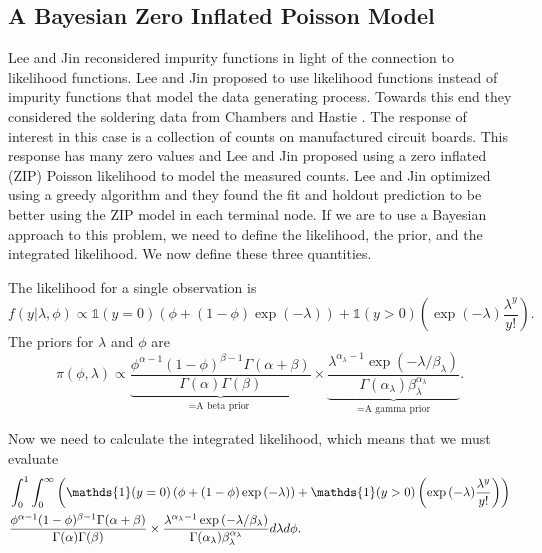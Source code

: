  \subsection{A Bayesian Zero Inflated Poisson Model}
 
 Lee and Jin \cite{lee2006decision} reconsidered impurity functions in light of the connection to likelihood functions. Lee and Jin \cite{lee2006decision} proposed to use likelihood functions instead of impurity functions that model the data generating process. Towards this end they considered the soldering data from Chambers and Hastie \cite{chambers1992statistical}. The response of interest in this case is a collection of counts on manufactured circuit boards. This response has many zero values and Lee and Jin \cite{lee2006decision} proposed using a zero inflated (ZIP) Poisson likelihood to model the measured counts. Lee and Jin \cite{lee2006decision} optimized using a greedy algorithm and they found the fit and holdout prediction to be better using the ZIP model in each terminal node. If we are to use a Bayesian approach to this problem, we need to define the likelihood, the prior, and the integrated likelihood. We now define these three quantities.
 
 The likelihood for a single observation is 
 \begin{equation}
 f(y\vert \lambda, \phi) \propto \mathds{1}(y=0)\left(\phi + (1-\phi)\exp{(-\lambda)}\right) + \mathds{1}(y>0)\left(\exp{(-\lambda)}\frac{\lambda^y}{y!}\right).
 \end{equation}
 The priors for $\lambda$ and $\phi$ are
 \begin{equation}
 \pi(\phi, \lambda)\propto \underbrace{\frac{\phi^{\alpha-1}(1-\phi)^{\beta-1}\Gamma(\alpha+\beta)}{\Gamma(\alpha)\Gamma(\beta)}}_{=\text{A beta prior }} \times \underbrace{\frac{ \lambda^{\alpha_{\lambda}-1}\exp{(-\lambda/\beta_{\lambda})} }{\Gamma(\alpha_{\lambda})\beta_{\lambda}^{\alpha_{\lambda}}}}_{=\text{A gamma prior}}.
 \end{equation}

 Now we need to calculate the integrated likelihood, which means that we must evaluate 
 \begin{align} \hspace{-.9in}
 &\int_0^1\int_0^\infty \left(\mathds{1}(y=0)\left(\phi + (1-\phi)\exp{(-\lambda)}\right) + \mathds{1}(y>0)\left(\exp{(-\lambda)}\frac{\lambda^y}{y!}\right)\right) \\ \nonumber
 & \frac{\phi^{\alpha-1}(1-\phi)^{\beta-1}\Gamma(\alpha+\beta)}{\Gamma(\alpha)\Gamma(\beta)} \times \frac{ \lambda^{\alpha_{\lambda}-1}\exp{(-\lambda/\beta_{\lambda})} }{\Gamma(\alpha_{\lambda})\beta_{\lambda}^{\alpha_{\lambda}}}d\lambda d\phi.
 \end{align}
 
